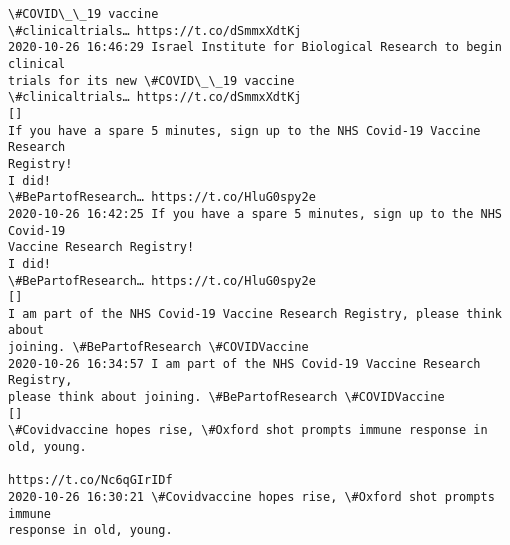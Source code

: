 \documentclass[11pt]{article}
\begin{document}
\begin{Verbatim}[commandchars=\\\{\}]
\#COVID\_\_19 vaccine
\#clinicaltrials… https://t.co/dSmmxXdtKj
2020-10-26 16:46:29 Israel Institute for Biological Research to begin clinical
trials for its new \#COVID\_\_19 vaccine
\#clinicaltrials… https://t.co/dSmmxXdtKj
[]
If you have a spare 5 minutes, sign up to the NHS Covid-19 Vaccine Research
Registry!
I did!
\#BePartofResearch… https://t.co/HluG0spy2e
2020-10-26 16:42:25 If you have a spare 5 minutes, sign up to the NHS Covid-19
Vaccine Research Registry!
I did!
\#BePartofResearch… https://t.co/HluG0spy2e
[]
I am part of the NHS Covid-19 Vaccine Research Registry, please think about
joining. \#BePartofResearch \#COVIDVaccine
2020-10-26 16:34:57 I am part of the NHS Covid-19 Vaccine Research Registry,
please think about joining. \#BePartofResearch \#COVIDVaccine
[]
\#Covidvaccine hopes rise, \#Oxford shot prompts immune response in old, young.

https://t.co/Nc6qGIrIDf
2020-10-26 16:30:21 \#Covidvaccine hopes rise, \#Oxford shot prompts immune
response in old, young.


\end{Verbatim}
\end{document}

